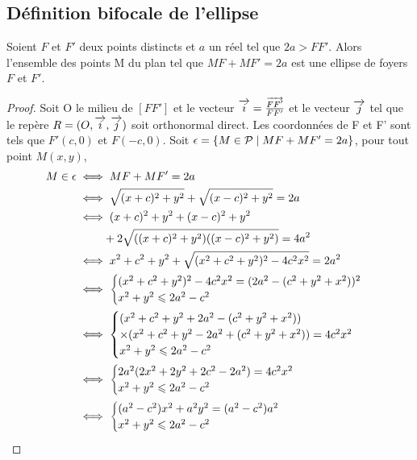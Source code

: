 \subsection{Définition bifocale de l'ellipse}
\begin{prop}
  \label{prop:bifellipse}
  Soient $F$ et $F'$ deux points distincts et $a$ un réel tel que $2a>FF'$. Alors l'ensemble des points M du plan tel que $MF+MF'=2a$ est une ellipse de foyers $F$ et $F'$.
\end{prop}
\begin{proof}
  Soit O le milieu de $[FF']$ et le vecteur $\overrightarrow{i}=\frac{\overrightarrow{FF'}}{FF'}$ et le vecteur $\overrightarrow{j}$ tel que le repère $R=(O,\overrightarrow{i},\overrightarrow{j})$ soit orthonormal direct. Les coordonnées de F et F' sont tels que $F'(c,0)$ et $F(-c,0)$. Soit $\epsilon=\left\{M \in \mathcal{P}\mathrel{}\middle|\mathrel{}MF+MF'=2a\right\}$, pour tout point $M(x,y)$,
  \begin{align}
    M \in \epsilon & \iff MF+MF'=2a \\
    & \iff \sqrt{(x+c)^2+y^2} + \sqrt{(x-c)^2+y^2}=2a \\
    & \iff (x+c)^2+y^2+(x-c)^2+y^2 \notag \\
    & \phantom{\iff} + 2\sqrt{((x+c)^2+y^2)((x-c)^2+y^2)}=4a^2 \label{eq:tag:1}\\
    & \iff x^2+c^2+y^2+\sqrt{(x^2+c^2+y^2)^2-4c^2x^2}=2a^2\\
    & \iff \begin{cases} (x^2+c^2+y^2)^2-4c^2x^2 = (2a^2-(c^2+y^2+x^2))^2 \\ x^2+y^2 \leqslant 2a^2 -c^2\\\end{cases}\\
    & \iff \begin{cases} (x^2+c^2+y^2 + 2a^2-(c^2+y^2+x^2)) \\ \times (x^2+c^2+y^2 - 2a^2+(c^2+y^2+x^2))=4c^2x^2  \\ x^2+y^2 \leqslant 2a^2 -c^2\end{cases}\\
    & \iff \begin{cases} 2a^2(2x^2+2y^2+2c^2-2a^2)=4c^2x^2  \\ x^2+y^2 \leqslant 2a^2 -c^2\end{cases}\\
    & \iff \begin{cases} (a^2-c^2)x^2 +a^2y^2=(a^2-c^2)a^2  \\ x^2+y^2 \leqslant 2a^2 -c^2\end{cases}
  \end{align}

\end{proof}

